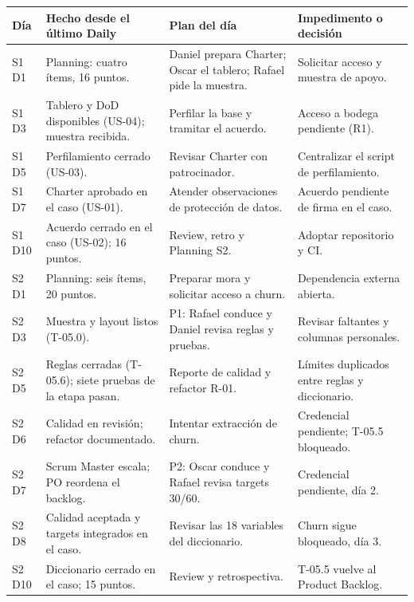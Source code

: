 \documentclass[10pt,a4paper]{article}
\begin{document}
{\footnotesize
\begin{tabularx}{\linewidth}{@{}l L L L@{}}
\toprule
Día & Hecho desde el último Daily & Plan del día & Impedimento o decisión \\
\midrule
S1 D1 & Planning: cuatro ítems, 16 puntos. & Daniel prepara Charter; Oscar el tablero; Rafael pide la muestra. & Solicitar acceso y muestra de apoyo. \\
S1 D3 & Tablero y DoD disponibles (US-04); muestra recibida. & Perfilar la base y tramitar el acuerdo. & Acceso a bodega pendiente (R1). \\
S1 D5 & Perfilamiento cerrado (US-03). & Revisar Charter con patrocinador. & Centralizar el script de perfilamiento. \\
S1 D7 & Charter aprobado en el caso (US-01). & Atender observaciones de protección de datos. & Acuerdo pendiente de firma en el caso. \\
S1 D10 & Acuerdo cerrado en el caso (US-02); 16 puntos. & Review, retro y Planning S2. & Adoptar repositorio y CI. \\
\midrule
S2 D1 & Planning: seis ítems, 20 puntos. & Preparar mora y solicitar acceso a churn. & Dependencia externa abierta. \\
S2 D3 & Muestra y layout listos (T-05.0). & P1: Rafael conduce y Daniel revisa reglas y pruebas. & Revisar faltantes y columnas personales. \\
S2 D5 & Reglas cerradas (T-05.6); siete pruebas de la etapa pasan. & Reporte de calidad y refactor R-01. & Límites duplicados entre reglas y diccionario. \\
S2 D6 & Calidad en revisión; refactor documentado. & Intentar extracción de churn. & \textcolor{alert}{Credencial pendiente; T-05.5 bloqueado.} \\
S2 D7 & Scrum Master escala; PO reordena el backlog. & P2: Oscar conduce y Rafael revisa targets 30/60. & Credencial pendiente, día 2. \\
S2 D8 & Calidad aceptada y targets integrados en el caso. & Revisar las 18 variables del diccionario. & Churn sigue bloqueado, día 3. \\
S2 D10 & Diccionario cerrado en el caso; 15 puntos. & Review y retrospectiva. & T-05.5 vuelve al Product Backlog. \\
\bottomrule
\end{tabularx}}
\end{document}
